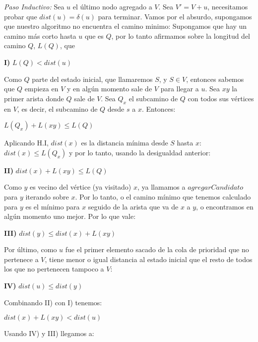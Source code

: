 \emph{Paso Inductivo:} Sea $u$ el último nodo agregado a $V$. Sea $V'= V + u$, necesitamos probar que $dist(u) = \delta(u)$ para terminar. Vamos por el absurdo, supongamos que nuestro algoritmo no encuentra el camino minimo: Supongamos que hay un camino más corto hasta $u$ que es $Q$, por lo tanto afirmamos sobre la longitud del camino $Q$, $L(Q)$, que
\\
\begin{center}
\textbf{I)} $L(Q) < dist(u)$
\\
\end{center}
Como $Q$ parte del estado inicial, que llamaremos $S$, y $S \in V$, entonces sabemos que $Q$ empieza en $V$ y en algún momento sale de $V$ para llegar a $u$. Sea $xy$ la primer arista donde $Q$ sale de $V$. Sea $Q_x$ el subcamino de $Q$ con todos sus vértices en $V$, es decir, el subcamino de $Q$ desde $s$ a $x$. Entonces:
\\
\begin{center}
$L(Q_x)+L(xy) \leq L(Q)$
\\
\end{center}
Aplicando H.I, $dist(x)$ es la distancia mínima desde $S$ hasta $x$: $dist(x) \leq L(Q_x)$ y por lo tanto, usando la desigualdad anterior:
\\
\begin{center}
\textbf{II)} $dist(x)+L(xy) \leq L(Q) $
\\
\end{center}
Como $y$ es vecino del vértice (ya visitado) $x$, ya llamamos a $agregarCandidato$ para $y$ iterando sobre $x$. Por lo tanto, o el camino mínimo que tenemos calculado para $y$ es el mínimo para $x$ seguido de la arista que va de $x$ a $y$, o encontramos en algún momento uno mejor. Por lo que vale:
\\
\begin{center}
\textbf{III)} $dist(y) \leq dist(x) + L(xy)$
\\
\end{center}
Por último, como $u$ fue el primer elemento sacado de la cola de prioridad que no pertenece a $V$, tiene menor o igual distancia al estado inicial que el resto de todos los que no pertenecen tampoco a $V$:
\\
\begin{center}
\textbf{IV)} $dist(u) \le dist(y) $
\\
\end{center}
Combinando II) con I) tenemos:
\\
\begin{center}
$dist(x)+L(xy) < dist(u)$
\\
\end{center}
Usando IV) y III) llegamos a:
\\

